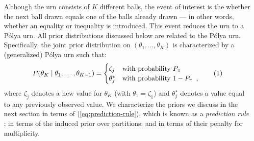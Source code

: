 \documentclass[11pt,a4paper]{article}
\theoremstyle{definition} %
\theoremstyle{case}
\newcommand{\numberthis}{\addtocounter{equation}{1}\tag{\theequation}}
\newcommand{\FD}[1]{\textcolor{red}{Fabian: #1 }}
\begin{document}
Although the urn consists of $K$ different balls, the event of interest is the whether the next ball drawn equals one of the balls already drawn --- in other words, whether an equality or inequality is introduced. This event reduces the urn to a P\'{o}lya urn. All prior distributions discussed below are related to the P\'{o}lya urn. Specifically, the joint prior distribution on $(\theta_1, \ldots, \theta_K)$ is characterized by a (generalized) P\'{o}lya urn such that:
\begin{equation} \label{eq:prediction-rule}
    P(\theta_K \mid \theta_1, \ldots, \theta_{K - 1}) = \begin{cases}
    \zeta_j & \text{with probability } P_{\pi} \\
    \theta_j^{\star} & \text{with probability }  1- P_{\pi} \enspace ,
    \end{cases} \numberthis
\end{equation}
where $\zeta_j$ denotes a new value for $\theta_K$ (with $\theta_1 = \zeta_1$) and $\theta_j^{\star}$ denotes a value equal to any previously observed value. We characterize the priors we discuss in the next section in terms of (\ref{eq:prediction-rule}), which is known as a \textit{prediction rule} \parencite[e.g.,][]{ishwaran2001gibbs}; in terms of the induced prior over partitions; and in terms of their penalty for multiplicity.



\end{document}
